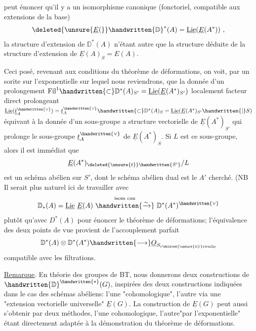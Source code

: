 peut énoncer qu'il y a un isomorphisme canonique (fonctoriel, compatible
aux extensions de la base)
\[
\deleted{\unsure{\underline E(}}\handwritten{\mathbb D}^{*}(A)=\underline{\mathrm{Lie}}(\underline E(A^{*}))\ ,
\]
la structure d'extension de $\mathbb D^{*}(A)$ n'étant autre que la structure
déduite de la structure d'extension de $\underline E(A)_S=E(A)$.

Ceci posé, revenant aux conditions du théorème de déformations, on
voit, par un sorite sur l'exponentielle sur lequel nous reviendrons, que
la donnée d'un prolongement $\mathrm{Fil}^{1}\handwritten{\subset}\mathbb D^{*}(A)_{S'}=\underline{\mathrm{Lie}}(\underline E(A^{*})_{S'})$ localement facteur
direct prolongeant $\underline{\mathrm{Lie}}(\underline{\underline{t}}^{\handwritten{\vee}}_A)=\underline t^{\handwritten{\vee}}_A\handwritten{\subset}\mathbb D^{*}(A)_S=\underline{\mathrm{Lie}}(\underline E(A^{*})_{S'}\handwritten{\mid} S)$ équivaut à
la donnée d'un sous-groupe  a structure vectorielle de $\underline E(A^{*})_{S'}$ qui prolonge le sous-groupe $\underline t_A^{\handwritten{\vee}}$ de $\underline E(A^{*})_S$. Si $L$ est ce sous-groupe, alors il est
immédiat que 
\[
\underline E(A^{*})_{\deleted{\unsure{t}}\handwritten{S'}}/L
\]
est un schéma abélien sur $S'$, dont le schéma abélien dual est le $A'$ cherché. (NB Il serait plus naturel ici de travailler avec 
\[
\mathbb D_{*}(A)=\underline{\mathrm{Lie}}\ \underline E(A)\ \overset{\text{isom can}}{\handwritten{\xrightarrow{\sim}}}\ \mathbb D^{*}(A^{*})^{\handwritten{\vee}}
\]
plutôt qu'avec $D^{*}(A)$ pour énoncer le théorème de déformations; l'équivalence des deux points de vue provient de l'accouplement parfait
\[
\mathbb D^{*}(A)\otimes\mathbb D^{*}(A^{*})\handwritten{\longrightarrow}\underline O_{S_{\mathrm{c}\deleted{\unsure{\mathrm{ii}}}\mathrm{risnilp}}}
\]
compatible avec les filtrations.\handwritten{)}

\uline{Remarque}. En théorie des groupes de BT, nous donnerons deux constructions de $\handwritten{\mathbb D}^{\handwritten{*}}(G)$, inspirées des deux constructions indiquées dans le cas des
schémas abéliens: l'une "cohomologique", l'autre via une "extension vectorielle universelle" $\underline E(G)$. La construction de $\underline E(G)$ peut aussi s'obtenir
par deux méthodes, l'une cohomologique, l'autre"par l'exponentielle" étant
directement adaptée à la démonstration du théorème de déformations.

